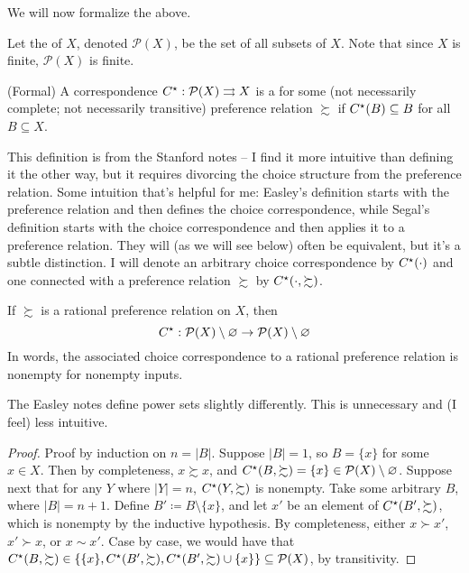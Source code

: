 \documentclass[12pt]{article}
\begin{document}
We will now formalize the above.

\begin{definition}
	Let the  of $X$, denoted $\mathcal{P}(X)$, be the set of all subsets of $X$. Note that since $X$ is finite, $\mathcal{P}(X)$ is finite.
\end{definition}

\begin{definition}
	(Formal) A correspondence $C^\star : \mathcal{P}(X) \rightrightarrows X$ is a  for some (not necessarily complete; not necessarily transitive) preference relation $\succsim$ if $C^\star(B) \subseteq B$ for all $B \subseteq X$.
\end{definition}
\begin{remark}
	This definition is from the Stanford notes -- I find it more intuitive than defining it the other way, but it requires divorcing the choice structure from the preference relation. Some intuition that's helpful for me: Easley's definition starts with the preference relation and then defines the choice correspondence, while Segal's definition starts with the choice correspondence and then applies it to a preference relation. They will (as we will see below) often be equivalent, but it's a subtle distinction. I will denote an arbitrary choice correspondence by $C^\star(\cdot)$ and one connected with a preference relation $\succsim$ by $C^\star(\cdot, \succsim)$.
\end{remark}

\begin{proposition}\label{prop:rational_choice_nonempty}
	If $\succsim$ is a rational preference relation on $X$, then
	\[
	C^\star : \mathcal{P}(X) \setminus \mathop{\varnothing} \to \mathcal{P}(X) \setminus \mathop{\varnothing} 
	\]
	In words, the associated choice correspondence to a rational preference relation is nonempty for nonempty inputs.
\end{proposition}
\begin{remark}
	The Easley notes define power sets slightly differently. This is unnecessary and (I feel) less intuitive.
\end{remark}
\begin{proof}
	Proof by induction on $n = |B|$. Suppose $|B| = 1$, so $B = \{x\}$ for some $x \in X$. Then by completeness, $x \succsim x$, and $C^\star(B,\succsim) = \{x\} \in \mathcal{P}(X) \setminus \mathop{\varnothing}$. Suppose next that for any $Y$ where $|Y| = n$, $C^\star(Y,\succsim)$ is nonempty. Take some arbitrary $B$, where $|B| = n + 1$. Define $B'\coloneqq B \setminus \{x\}$, and let $x'$ be an element of $C^\star(B',\succsim)$, which is nonempty by the inductive hypothesis. By completeness, either $x \succ x'$, $x' \succ x$, or $x \sim x'$. Case by case, we would have that $C^\star(B,\succsim) \in \left\{\{x\},C^\star(B',\succsim),C^\star(B',\succsim) \cup \{x\}\right\} \subseteq \mathcal{P}(X)$, by transitivity.
\end{proof}
\end{document}
